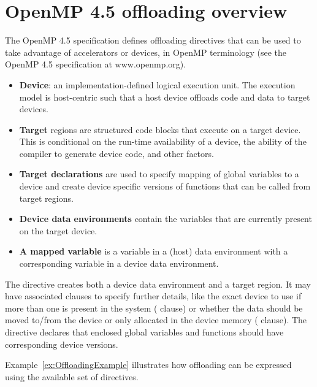 \section{OpenMP 4.5 offloading overview}\label{sc:OpenMP offloading overview}

The OpenMP 4.5 specification defines offloading directives that can be used to take advantage of accelerators or devices, in OpenMP terminology (see the OpenMP 4.5 specification at www.openmp.org).
\begin{itemize}
  \item \textbf{Device}: an implementation-defined logical execution unit. The execution model is host-centric such that a host device offloads code and data to target devices.

  \item \textbf{Target} regions are structured code blocks that execute on a target device. This is conditional on the run-time availability of a device, the ability of the compiler to generate device code, and other factors. 

  \item \textbf{Target declarations} are used to specify mapping of global variables to a device and create device specific versions of functions that can be called from target regions.

  \item \textbf{Device data environments} contain the variables that are currently present on the target device.

  \item \textbf{A mapped variable} is a variable in a (host) data environment with a corresponding variable in a device data environment.

\end{itemize}

The \dtarget{} directive creates both a device data environment and a target region. It may have associated clauses to specify further details, like the exact device to use if more than one is present in the system (\cdevice{} clause) or whether the data should be moved to/from the device or only allocated in the device memory (\cmap{} clause). The \ddeclaretarget{} directive declares that enclosed global variables and functions should have corresponding device versions.

Example~\ref{ex:OffloadingExample} illustrates how offloading can be expressed using the available set of directives.


